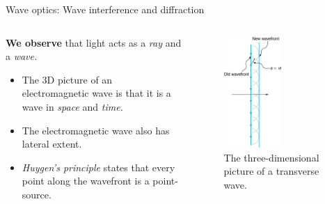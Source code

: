 \documentclass{beamer}
\begin{document}
\begin{frame}{Wave optics: Wave interference and diffraction}
\begin{columns}[T]
\begin{column}{0.5\textwidth}
\small
\textbf{We observe} that light acts as a \textit{ray} and a \textit{wave.}
\begin{itemize}
\item The 3D picture of an electromagnetic wave is that it is a wave in \textit{space} and \textit{time.}
\item The electromagnetic wave also has lateral extent.
\item \textit{Huygen's principle} states that every point along the wavefront is a point-source.
\end{itemize}
\end{column}
\begin{column}{0.5\textwidth}
\begin{figure}
\centering
\includegraphics[width=0.55\textwidth]{figures/wave2.png}
\caption{\label{fig:wave2} \footnotesize The three-dimensional picture of a transverse wave.}
\end{figure}
\end{column}
\end{columns}
\end{frame}
\end{document}
